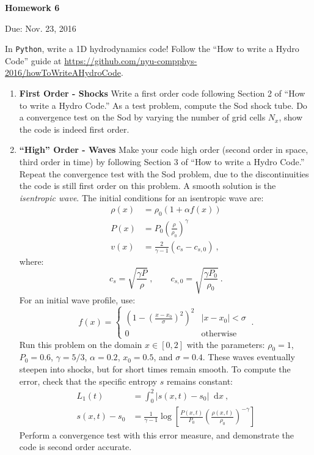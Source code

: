 \documentclass{article}
\newcommand{\Python}{{\texttt{Python}}}
\newcommand*\diff{\mathop{}\!\mathrm{d}}
\begin{document}
\begin{center}

\vspace*{-2.5cm}
\LARGE
\bf{Homework 6}
\vspace{1cm}

\large{Due: Nov. 23, 2016}
\vspace{1cm}

\end{center}

In \Python{}, write a 1D hydrodynamics code!  Follow the ``How to write a Hydro Code'' guide at \url{https://github.com/nyu-compphys-2016/howToWriteAHydroCode}.

\begin{enumerate}
	\item {\bf First Order - Shocks} 
		Write a first order code following Section 2 of ``How to write a Hydro Code.'' As a test problem, compute the Sod shock tube.  Do a convergence test on the Sod by varying the number of grid cells $N_x$, show the code is indeed first order.
	\item {\bf ``High'' Order - Waves} 
		Make your code high order (second order in space, third order in time) by following Section 3 of  ``How to write a Hydro Code.''  Repeat the convergence test with the Sod problem, due to the discontinuities the code is still first order on this problem.  A smooth solution is the \emph{isentropic wave}.  The initial conditions for an isentropic wave are:
		\begin{align}
			\rho(x) &= \rho_0 \left( 1 + \alpha f(x) \right) \\
			P(x) &= P_0 \left(\frac{\rho}{\rho_0}\right)^\gamma \\
			v(x) &= \frac{2}{\gamma-1} \left( c_s - c_{s,0} \right) \ ,
		\end{align}
		where:
		\begin{equation}
			c_s = \sqrt{\frac{\gamma P}{\rho}} \ , \qquad c_{s,0} = \sqrt{\frac{\gamma P_0}{\rho_0}} \ .
		\end{equation}
		For an initial wave profile, use:
		\begin{equation}
			f(x) = \left \{ \begin{matrix} 
						\left(1-\left(\frac{x-x_0}{\sigma}\right)^2\right)^2 & |x-x_0| < \sigma \\
						0 & \text{otherwise}
					\end{matrix} \right . \ .
		\end{equation}
		Run this problem on the domain $x \in [0,2]$ with the parameters: $\rho_0 = 1$, $P_0=0.6$, $\gamma=5/3$, $\alpha=0.2$, $x_0=0.5$, and $\sigma=0.4$.  
		These waves eventually steepen into shocks, but for short times remain smooth.  To compute the error, check that the specific entropy $s$ remains constant:
		\begin{align}
			L_1(t) & = \int_0^2 |s(x,t) - s_0| \diff x \ , \\
			s(x,t)-s_0 &= \frac{1}{\gamma-1} \log \left[\frac{P(x,t)}{P_0} \left(\frac{\rho(x,t)}{\rho_0}\right)^{-\gamma}\right]
		\end{align}
		Perform a convergence test with this error measure, and demonstrate the code is second order accurate.
\end{enumerate}
\end{document}
